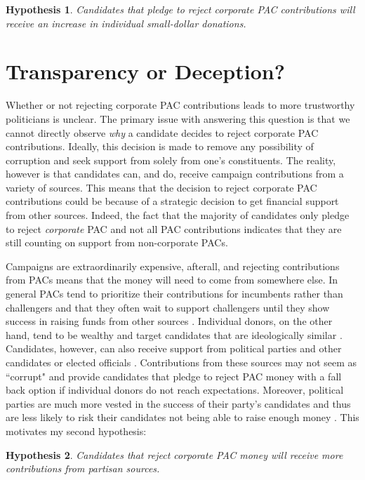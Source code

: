 \documentclass[12pt]{article}
\newtheorem{hyp}{Hypothesis}
\begin{document}
 \begin{hyp}
 	Candidates that pledge to reject corporate PAC contributions will receive an increase in individual small-dollar donations. 
 \end{hyp}



\section{Transparency or Deception?}

Whether or not rejecting corporate PAC contributions leads to more trustworthy politicians is unclear. The primary issue with answering this question is that we cannot directly observe \emph{why} a candidate decides to reject corporate PAC contributions. Ideally, this decision is made to remove any possibility of corruption and seek support from solely from one's constituents. The reality, however is that candidates can, and do, receive campaign contributions from a variety of sources. This means that the decision to reject corporate PAC contributions could be because of a strategic decision to get financial support from other sources. Indeed, the fact that the majority of candidates only pledge to reject \emph{corporate} PAC and not all PAC contributions indicates that they are still counting on support from non-corporate PACs.
 
 Campaigns are extraordinarily expensive, afterall, and rejecting contributions from PACs means that the money will need to come from somewhere else. In general PACs tend to prioritize their contributions for incumbents rather than challengers \citep{brunell2005} and that they often wait to support challengers until they show success in raising funds from other sources \citep{biersack1993}. Individual donors, on the other hand, tend to be wealthy \citep{brown1995} and target candidates that are ideologically similar \citep{bonica2014}. Candidates, however, can also receive support from political parties and other candidates or elected officials \citep{wilcox1989, currinder2003}. Contributions from these sources may not seem as ``corrupt" and provide candidates that pledge to reject PAC money with a fall back option if individual donors do not reach expectations. Moreover, political parties are much more vested in the success of their party's candidates and thus are less likely to risk their candidates not being able to raise enough money \citep{herrnson2009}. This motivates my second hypothesis:
 
 \begin{hyp}
 	Candidates that reject corporate PAC money will receive more contributions from partisan sources.  
 \end{hyp}
 
\end{document}

